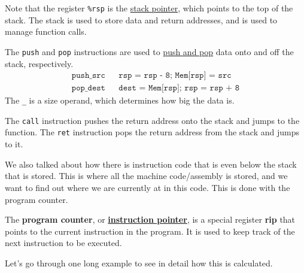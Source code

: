   Note that the register \texttt{\%rsp} is the \hyperref[def:stack-pointer]{stack pointer}, which points to the top of the stack. The stack is used to store data and return addresses, and is used to manage function calls. 

  \begin{definition}
    \label{def:push-and-pop-2}
    The \texttt{push} and \texttt{pop} instructions are used to \hyperref[def:push-and-pop]{push and pop} data onto and off the stack, respectively. 
    \begin{align*}
      \texttt{push\_ src} && \texttt{rsp = rsp - 8; Mem[rsp] = src} \\
      \texttt{pop\_ dest} && \texttt{dest = Mem[rsp]; rsp = rsp + 8} 
    \end{align*}
    The \texttt{\_} is a size operand, which determines how big the data is.
  \end{definition}

  \begin{definition}
    \label{def:call-and-ret}
    The \texttt{call} instruction pushes the return address onto the stack and jumps to the function. The \texttt{ret} instruction pops the return address from the stack and jumps to it.
  \end{definition}

  We also talked about how there is instruction code that is even below the stack that is stored. This is where all the machine code/assembly is stored, and we want to find out where we are currently at in this code. This is done with the program counter. 

  \begin{definition}
    \label{def:program-counter-instruction-pointer}
 
    The \textbf{program counter}, or \textbf{\hyperref[def:instruction-pointer]{instruction pointer}}, is a special register \textbf{rip} that points to the current instruction in the program. It is used to keep track of the next instruction to be executed.
  \end{definition}

  Let's go through one long example to see in detail how this is calculated. 
  
